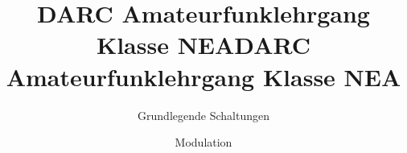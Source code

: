 \documentclass[aspectratio = 169]{beamer}
\begin{document}
\title{DARC Amateurfunklehrgang Klasse NEA}
\author{Grundlegende Schaltungen}
\begin{frame}
\maketitle
\end{frame}

























\title{DARC Amateurfunklehrgang Klasse NEA}
\author{Modulation}
\begin{frame}
\maketitle
\end{frame}



















\end{document}
